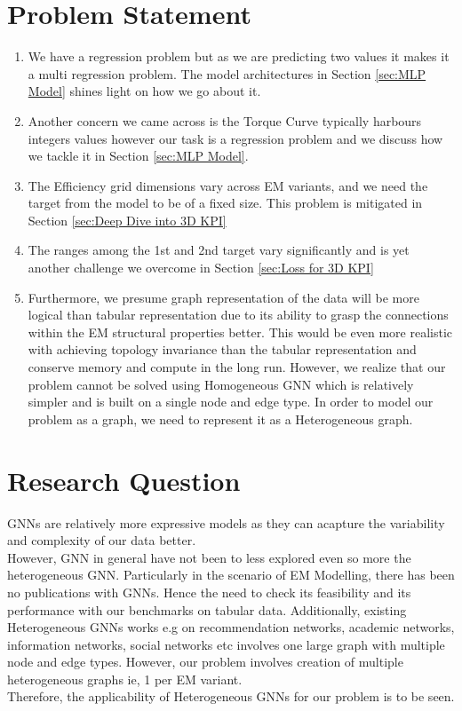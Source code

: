 \documentclass{report} %
\begin{document}
\section{Problem Statement}\label{sec:Problem Statement}

\begin{enumerate}

    \item We have a regression problem but as we are predicting two values it makes it a multi regression problem. The model architectures in Section \ref{sec:MLP Model} shines light on how we go about it.
    \item Another concern we came across is the Torque Curve typically harbours integers values however our task is a regression problem and we discuss how we tackle it in Section \ref{sec:MLP Model}. 
    \item The Efficiency grid dimensions vary across \ac{EM} variants, and we need the target from the model to be of a fixed size. This problem is mitigated in Section \ref{sec:Deep Dive into 3D KPI}
    \item The ranges among the 1st and 2nd target vary significantly and is yet another challenge we overcome in Section \ref{sec:Loss for 3D KPI}
    \item Furthermore, we presume graph representation of the data will be more logical than tabular representation due to its ability to grasp the connections within the \ac{EM} structural properties better.
    This would be even more realistic with achieving topology invariance than the tabular representation and conserve memory and compute in the long run.
    However, we realize that our problem cannot be solved using Homogeneous \ac{GNN} which is relatively simpler and is built on a single node and edge type.
    In order to model our problem as a graph, we need to represent it as a Heterogeneous graph. \\

\end{enumerate}

\section{Research Question}\label{sec:Research Question}
\ac{GNN}s are relatively more expressive models as they can acapture the variability and complexity of our data better.\\
However, \ac{GNN} in general have not been to less explored even so more the heterogeneous \ac{GNN}.
Particularly in the scenario of \ac{EM} Modelling, there has been no publications with \ac{GNN}s.
Hence the need to check its feasibility and its performance with our benchmarks on tabular data.
Additionally, existing Heterogeneous \ac{GNN}s works e.g on recommendation networks, academic networks, information networks, social networks etc involves one large graph with multiple node and edge types. 
However, our problem involves creation of multiple heterogeneous graphs ie, 1 per \ac{EM} variant.\\
Therefore, the applicability of Heterogeneous \ac{GNN}s for our problem is to be seen.\\
\end{document}
